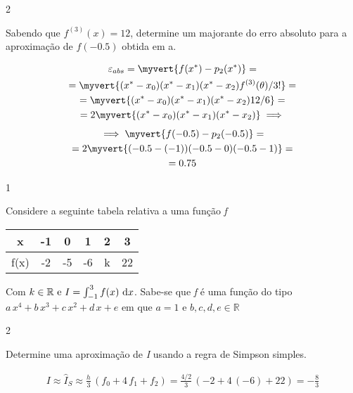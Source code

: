 \documentclass[CN_A-Tests_Resolutions.tex]{subfiles}
\begin{document}
\begin{questionBox}2{} %

  Sabendo que \(f^{(3)}(x) = 12\), determine um majorante do erro absoluto para a aproximação de \(f(-0.5)\) obtida em a.

  \answer{}

  \begin{gather*}
    \varepsilon_{abs}
    = \myvert{f(x^*)-p_2(x^*)}
    = \\
    = \myvert{
      (x^*-x_0)
      (x^*-x_1)
      (x^*-x_2)
      f^{(3)}(\theta)/3!
    }
    = \\
    = \myvert{
      (x^*-x_0)
      (x^*-x_1)
      (x^*-x_2)
      12/6
    }
    = \\
    = 2\myvert{
      (x^*-x_0)
      (x^*-x_1)
      (x^*-x_2)
    }
    \implies\\[1ex]
    \implies
    \myvert{f(-0.5)-p_2(-0.5)}
    = \\
    = 2\myvert{
      (-0.5-(-1))
      (-0.5-0)
      (-0.5-1)
    }
    = \\
    = 0.75
  \end{gather*}

\end{questionBox}


\begin{questionBox}1{} %

  Considere a seguinte tabela relativa a uma função \textit{f}
  \begin{center}
    \vspace{1ex}
    \begin{tabular}{C | *{5}{C}}
      x 
      & -1 & 0 & 1 & 2 & 3
      \\\hline
      f(x)
      & -2 & -5 & -6 & k & 22
    \end{tabular}
    \vspace{2ex}
  \end{center}
  Com \(k\in\mathbb{R}\text{ e }I=\int_{-1}^3{f(x)\,\odif{x}}\).
  Sabe-se que \textit{f} é uma função do tipo \(a\,x^4+b\,x^3+c\,x^2+d\,x+e\) em que \(a=1\text{ e }b,c,d,e\in\mathbb{R}\)

\end{questionBox}

\begin{questionBox}2{} %

  Determine uma aproximação de \textit{I} usando a regra de Simpson simples.

  \answer{}

  \begin{gather*}
    I\approx
    \hat{I}_S
    \approx 
    \frac{h}{3}\,(f_0+4\,f_1+f_2)
    = \frac{4/2}{3}\,(-2+4\,(-6)+22)
    = -\frac{8}{3}
  \end{gather*}

\end{questionBox}
\end{document}
